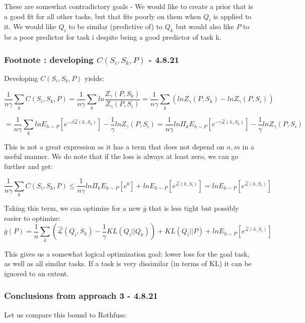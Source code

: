 \documentclass[letterpaper]{article}
\theoremstyle{definition}
\begin{document}
These are somewhat contradictory goals - We would like to create a prior that is a good fit for all other tasks, but that fits poorly on them when $Q_i$ is applied to it. We would like $Q_i$ to be similar (predictive of) to $Q_k$ but would also like $P$ to be a poor predictor for task i despite being a good predictor of task k.

\subsubsection*{Footnote : developing $C(S_i,S_k,P)$ - 4.8.21}

Developing $C(S_i,S_k,P)$ yields:

$$\frac{1}{n\gamma}\sum_k C(S_i,S_k,P) = \frac{1}{n\gamma}\sum_k ln\frac{Z_{\gamma}(P,S_k)}{ Z_{\gamma}(P,S_i)} = 
\frac{1}{n\gamma}\sum_k \left (lnZ_{\gamma}(P,S_k) - lnZ_{\gamma}(P,S_i) \right )$$

$$=  
\frac{1}{n\gamma}\sum_k lnE_{h\sim P}\left [e^{-\beta\hat{\mathcal{L}}(h,S_k)}\right ] - \frac{1}{\gamma}lnZ_{\gamma}(P,S_i) 
=
\frac{1}{n\gamma}ln\Pi_k E_{h\sim P}\left [e^{-\gamma\hat{\mathcal{L}}(h,S_k)}\right ] - \frac{1}{\gamma}lnZ_{\gamma}(P,S_i) $$

This is not a great expression as it has a term that does not depend on $n,m$ in a useful manner.
We do note that if the loss is always at least zero, we can go further and get:

$$\frac{1}{n\gamma}\sum_k C(S_i,S_k,P) \leq \frac{1}{n\gamma}ln \Pi_k E_{h\sim P} \left [e^{0}\right ] + ln E_{h\sim P}\left [ e^{\hat{\mathcal{L}}(h,S_i)}\right ]=lnE_{h\sim P}\left [ e^{\hat{\mathcal{L}}(h,S_i)}\right ]$$

Taking this term, we can optimize for a new $\bar{g}$ that is less tight but possibly easier to optimize: 
$$\bar{g}(P)=\frac{1}{n}\sum_k \left (\hat{\mathcal{L}}(Q_i,S_k)-\frac{1}{\gamma}KL(Q_i||Q_k)\right )+ KL(Q_i||P)+lnE_{h\sim P}\left [ e^{\hat{\mathcal{L}}(h,S_i)}\right ]$$ 

This gives us a somewhat logical optimization goal: lower loss for the goal task, as well as all similar tasks. If a task is very dissimilar (in terms of KL) it can be ignored to an extent.

\subsubsection*{Conclusions from approach 3 - 4.8.21}

Let us compare this bound to Rothfuss:
\end{document}
